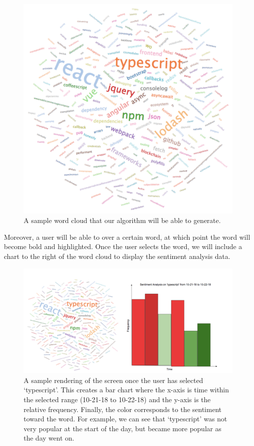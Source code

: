 \documentclass[11pt]{article}
\begin{document}
 \begin{figure}[H]
 	\centering
 	 \includegraphics[scale=0.3]{word_cloud}
 	\caption{A sample word cloud that our algorithm will be able to generate.}
 \end{figure}

\tab Moreover, a user will be able to over a certain word, at which point the word will become bold and highlighted. Once the user selects the word, we will include a chart to the right of the word cloud to display the sentiment analysis data.

 \begin{figure}[H]
 	\centering
 	 \includegraphics[scale=0.5]{graph}
 	\caption{A sample rendering of the screen once the user has selected ‘typescript’. This creates a bar chart where the x-axis is time within the selected range (10-21-18 to 10-22-18) and the y-axis is the relative frequency. Finally, the color corresponds to the sentiment toward the word. For example, we can see that ‘typescript’ was not very popular at the start of the day, but became more popular as the day went on.}
 \end{figure}
\end{document}
